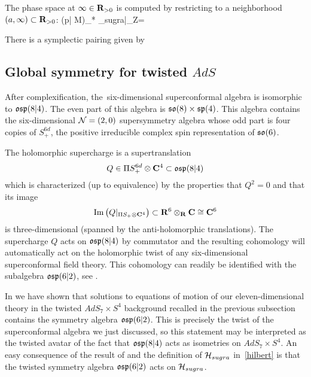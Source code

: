 The phase space at $\infty\in \mathbf{R}_{>0}$ is computed by restricting to a neighborhood $(a, \infty)\subset \mathbf{R}_{>0}$:
\beqn
(p| \mathring M)_* \cL_{sugra}|_{\infty \times Z}=
\eeqn

There is a symplectic pairing given by
\beqn
\eeqn



\subsection{Global symmetry for twisted $AdS$}
\label{s:global1}

After complexification, the~six-dimensional superconformal algebra is isomorphic to $\mathfrak{osp}(8|4)$.
The even part of this algebra is $\mathfrak{so}(8) \times \mathfrak{sp}(4)$.
This algebra contains the six-dimensional $\mathcal N=(2,0)$ supersymmetry algebra whose odd part is four copies of $S^{6d}_+$, the positive irreducible complex spin representation of $\mathfrak{so}(6)$.

The holomorphic supercharge is a supertranslation
\[
Q \in \Pi S^{6d}_+ \otimes \mathbf{C}^4 \subset \mathfrak{osp}(8|4)
\]
which is characterized (up to equivalence) by the properties that $Q^2 = 0$ and that its image
\[
{\rm Im}\left(Q|_{\Pi S_+ \otimes \mathbf{C}^4} \right) \subset \mathbf{R}^6 \otimes_{\mathbf{R}} \mathbf{C} \cong \mathbf{C}^6
\]
is three-dimensional (spanned by the anti-holomorphic translations). 
The supercharge $Q$ acts on $\mathfrak{osp}(8|4)$ by commutator and the resulting cohomology will automatically act on the holomorphic twist of any six-dimensional superconformal field theory. 
This cohomology can readily be identified with the subalgebra $\mathfrak{osp}(6|2)$, see \cite{SWsuco2}. 


In \cite{RSW} we have shown that solutions to equations of motion of our eleven-dimensional theory in the twisted $AdS_{7}\times S^{4}$ background recalled in the previous subsection contains the symmetry algebra $\mathfrak{osp}(6|2)$. This is precisely the twist of the superconformal algebra we just discussed, so this statement may be interpreted as the twisted avatar of the fact that $\mathfrak{osp}(8|4)$ acts as isometries on $AdS_{7}\times S^{4}.$ An easy consequence of the result of \cite{RSW} and the definition of $\mathcal H_{sugra}$ in~\ref{hilbert} is that the twisted symmetry algebra $\mathfrak{osp}(6|2)$ acts on $\mathcal H_{sugra}$.

